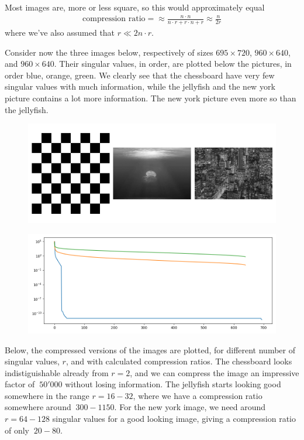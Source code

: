 \documentclass[12p,a4paper]{article}
\begin{document}
Most images are, more or less square, so this would approximately equal
\begin{align*}
    \text{compression ratio} = \approx \frac{n\cdot n}{n\cdot r + r\cdot n + r} \approx \frac{n}{2r} 
\end{align*}
where we've also assumed that $r \ll 2n\cdot r$.

Consider now the three images below, respectively of sizes $695\times 720$, $960 \times 640$, and $960 \times 640$. Their singular values, in order, are plotted below the pictures, in order blue, orange, green. We clearly see that the chessboard have very few singular values with much information, while the jellyfish and the new york picture contains a lot more information. The new york picture even more so than the jellyfish.

\begin{figure}[H]
    \centering
    \includegraphics[width=1.0\linewidth]{../figs/original_img.png}
\end{figure}

\begin{figure}[H]
    \centering
    \includegraphics[width=1.0\linewidth]{../figs/singular_values.png}
\end{figure}


Below, the compressed versions of the images are plotted, for different number of singular values, $r$, and with calculated compression ratios. The chessboard looks indistiguishable already from $r=2$, and we can compress the image an impressive factor of $~50'000$ without losing information. The jellyfish starts looking good somewhere in the range $r=16-32$, where we have a compression ratio somewhere around $~300-1150$. For the new york image, we need around $r=64-128$ singular values for a good looking image, giving a compression ratio of only $~20-80$.
\end{document}
